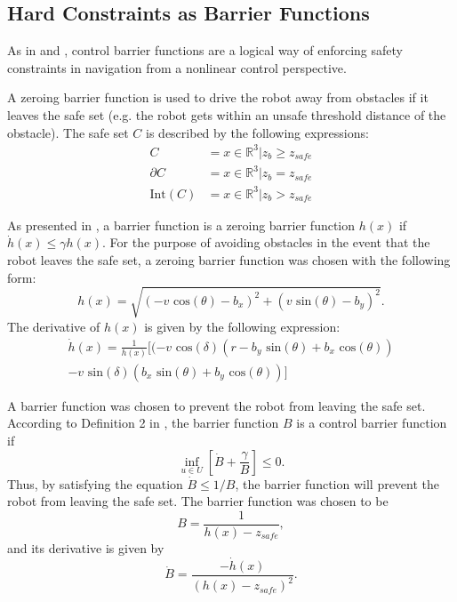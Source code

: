 \documentclass[journal]{IEEEtran}
\begin{document}
\subsection{Hard Constraints as Barrier Functions}
As in \cite{amesACC} and \cite{ames2014esclf}, control barrier functions are a logical way of enforcing safety constraints in navigation from a nonlinear control perspective. 

A zeroing barrier function is used to drive the robot away from obstacles if it leaves the safe set (e.g. the robot gets within an unsafe threshold distance of the obstacle). The safe set $C$ is described by the following expressions:
\begin{align}
C &= {x \in \mathbb{R}^3 | z_b\geq z_{safe}}\\
\partial C &= {x \in \mathbb{R}^3 | z_b=z_{safe}}\\
\text{Int}(C) &= {x \in \mathbb{R}^3 | z_b > z_{safe}}
\end{align}

As presented in \cite{ames2015robust}, a barrier function is a zeroing barrier function $h(x)$ if $\dot{h}(x)\leq \gamma h(x).$ For the purpose of avoiding obstacles in the event that the robot leaves the safe set, a zeroing barrier function was chosen with the following form:
\begin{equation}
h(x)=\sqrt{(-v\text{ cos}(\theta)-b_x)^2+(v\text{ sin}(\theta)-b_y)^2}.
\end{equation}
The derivative of $h(x)$ is given by the following expression:
\begin{equation}
\begin{split}
\dot{h}(x)=\frac{1}{h(x)}[(-v\text{ cos}(\delta)(r-b_y\text{ sin}(\theta)+b_x\text{ cos}(\theta)) \\
-v\text{ sin}(\delta)(b_x\text{ sin}(\theta)+b_y\text{ cos}(\theta))]
\end{split}
\label{zbf}
\end{equation}

A barrier function was chosen to prevent the robot from leaving the safe set. According to Definition 2 in \cite{amesACC}, the barrier function $B$ is a control barrier function if 
\begin{equation}
\inf_{u\in U}\left[ \dot{B}+\frac{\gamma}{B} \right] \leq 0.
\label{eq:cbf}
\end{equation} Thus, by satisfying the equation $\dot{B}\leq 1/B$, the barrier function will prevent the robot from leaving the safe set. The barrier function was chosen to be
\begin{equation}
B=\frac{1}{h(x)-z_{safe}},
\label{bf}
\end{equation}
and its derivative is given by
\begin{equation}
\dot{B}=\frac{-\dot{h}(x)}{(h(x)-z_{safe})^2}.
\end{equation}
\end{document}
